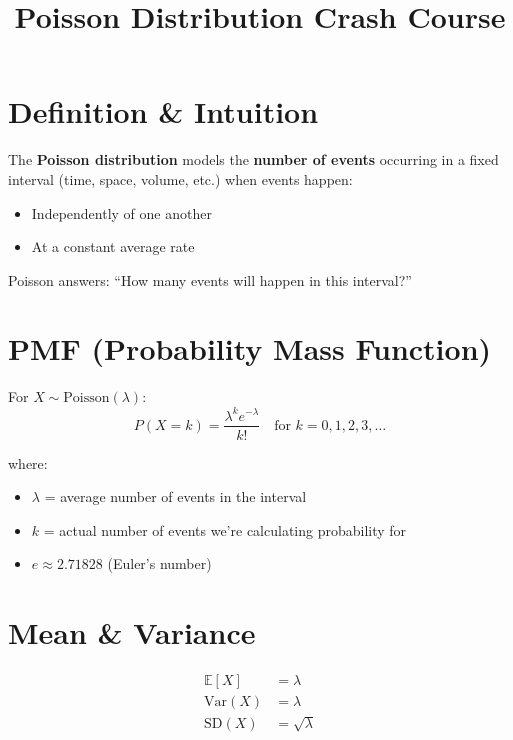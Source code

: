 \documentclass[11pt]{article}
\title{\textbf{Poisson Distribution Crash Course}}
\author{}
\date{}
\begin{document}
\maketitle

\section{Definition \& Intuition}

The \textbf{Poisson distribution} models the \textbf{number of events} occurring in a fixed interval (time, space, volume, etc.) when events happen:
\begin{itemize}[noitemsep]
    \item Independently of one another
    \item At a constant average rate
\end{itemize}

\begin{tcolorbox}[colback=blue!5!white,colframe=blue!75!black,title=Key Insight]
Poisson answers: ``How many events will happen in this interval?''
\end{tcolorbox}

\section{PMF (Probability Mass Function)}

For $X \sim \text{Poisson}(\lambda)$:
\[
P(X = k) = \frac{\lambda^k e^{-\lambda}}{k!} \quad \text{for } k = 0, 1, 2, 3, \ldots
\]

where:
\begin{itemize}[noitemsep]
    \item $\lambda$ = average number of events in the interval
    \item $k$ = actual number of events we're calculating probability for
    \item $e \approx 2.71828$ (Euler's number)
\end{itemize}

\section{Mean \& Variance}

\begin{align*}
\mathbb{E}[X] &= \lambda \\
\text{Var}(X) &= \lambda \\
\text{SD}(X) &= \sqrt{\lambda}
\end{align*}
\end{document}

